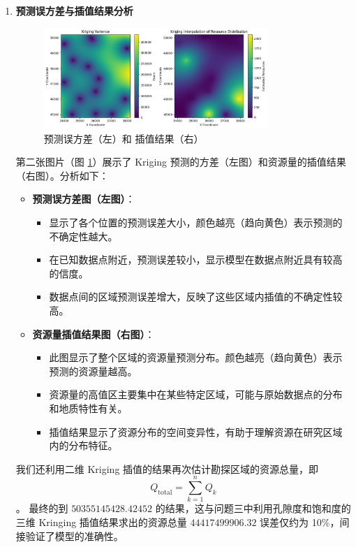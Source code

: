 \documentclass[12pt,a4paper]{nmmcm}
\begin{document}
\begin{enumerate}
  \item \textbf{预测误方差与插值结果分析} \\
        \begin{figure}[H]
          \centering
          \includegraphics[width=0.8\textwidth]{figures/task4/task4-2.png}
          \caption{预测误方差（左）和 插值结果（右）}
          \label{fig:KrigingInterpolation}
        \end{figure}
        第二张图片（图 \ref{fig:KrigingInterpolation}）展示了 Kriging 预测的方差（左图）和资源量的插值结果（右图）。分析如下：
        \begin{itemize}
          \item \textbf{预测误方差图（左图）}：
                \begin{itemize}
                  \item 显示了各个位置的预测误差大小，颜色越亮（趋向黄色）表示预测的不确定性越大。
                  \item 在已知数据点附近，预测误差较小，显示模型在数据点附近具有较高的信度。
                  \item 数据点间的区域预测误差增大，反映了这些区域内插值的不确定性较高。
                \end{itemize}
          \item \textbf{资源量插值结果图（右图）}：
                \begin{itemize}
                  \item 此图显示了整个区域的资源量预测分布。颜色越亮（趋向黄色）表示预测的资源量越高。
                  \item 资源量的高值区主要集中在某些特定区域，可能与原始数据点的分布和地质特性有关。
                  \item 插值结果显示了资源分布的空间变异性，有助于理解资源在研究区域内的分布特征。
                \end{itemize}
        \end{itemize}

        我们还利用二维 Kriging 插值的结果再次估计勘探区域的资源总量，即
        \[
          Q_{\text{total}} = \sum_{k=1}^{n} Q_k
        \]。
        最终的到 $50355145428.42452$ 的结果，这与问题三中利用孔隙度和饱和度的三维 Kringing 插值结果求出的资源总量 $44417499906.32$ 误差仅约为 10\%，间接验证了模型的准确性。

\end{enumerate}
\end{document}
